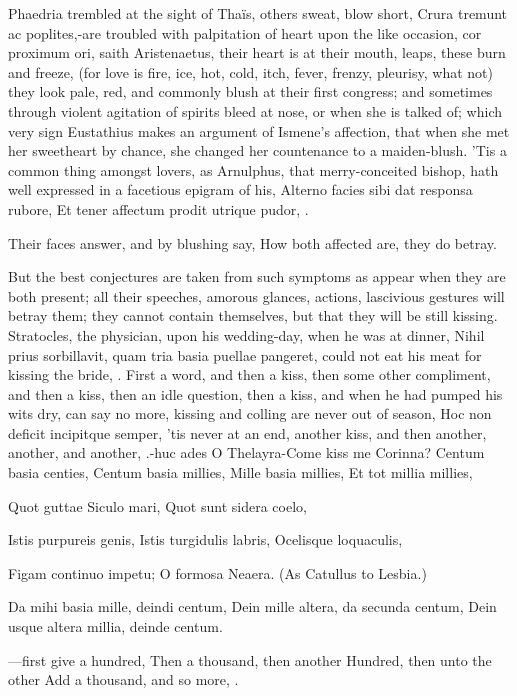 Phaedria trembled at the sight of Thaïs, others sweat, blow short,
Crura tremunt ac poplites,-are troubled with palpitation of heart upon
the like occasion, cor proximum ori, saith Aristenaetus, their
heart is at their mouth, leaps, these burn and freeze, (for love is
fire, ice, hot, cold, itch, fever, frenzy, pleurisy, what not) they
look pale, red, and commonly blush at their first congress; and
sometimes through violent agitation of spirits bleed at nose, or when
she is talked of; which very sign Eustathius makes an argument of
Ismene's affection, that when she met her sweetheart by chance, she
changed her countenance to a maiden-blush. 'Tis a common thing amongst
lovers, as Arnulphus, that merry-conceited bishop, hath well
expressed in a facetious epigram of his,
Alterno facies sibi dat responsa rubore,
Et tener affectum prodit utrique pudor, \etc{}.

Their faces answer, and by blushing say,
How both affected are, they do betray.

But the best conjectures are taken from such symptoms as appear when
they are both present; all their speeches, amorous glances, actions,
lascivious gestures will betray them; they cannot contain themselves,
but that they will be still kissing. Stratocles, the physician,
upon his wedding-day, when he was at dinner, Nihil prius sorbillavit,
quam tria basia puellae pangeret, could not eat his meat for kissing
the bride, \etc{}. First a word, and then a kiss, then some other
compliment, and then a kiss, then an idle question, then a kiss, and
when he had pumped his wits dry, can say no more, kissing and colling
are never out of season, Hoc non deficit incipitque semper, 'tis
never at an end, another kiss, and then another, another, and
another, \etc{}.-huc ades O Thelayra-Come kiss me Corinna?
Centum basia centies,
Centum basia millies,
Mille basia millies,
Et tot millia millies,

Quot guttae Siculo mari,
Quot sunt sidera coelo,

Istis purpureis genis,
Istis turgidulis labris,
Ocelisque loquaculis,

Figam continuo impetu;
O formosa Neaera. (As Catullus to Lesbia.)

Da mihi basia mille, deindi centum,
Dein mille altera, da secunda centum,
Dein usque altera millia, deinde centum.

---first give a hundred,
Then a thousand, then another
Hundred, then unto the other
Add a thousand, and so more, \etc{}.

